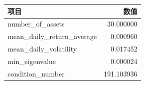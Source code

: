 \begin{center}
\small
\begin{tabular}{lr}
\toprule
项目 & 数值 \\
\midrule
number\_of\_assets & 30.000000 \\
mean\_daily\_return\_average & 0.000960 \\
mean\_daily\_volatility & 0.017452 \\
min\_eigenvalue & 0.000024 \\
condition\_number & 191.103936 \\
\bottomrule
\end{tabular}
\end{center}